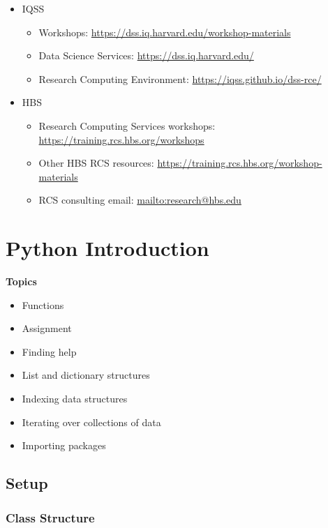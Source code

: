\documentclass[]{book}
\providecommand{\tightlist}{%
  \setlength{\itemsep}{0pt}\setlength{\parskip}{0pt}}
\begin{document}
\begin{itemize}
\tightlist
\item
  IQSS

  \begin{itemize}
  \tightlist
  \item
    Workshops: \url{https://dss.iq.harvard.edu/workshop-materials}
  \item
    Data Science Services: \url{https://dss.iq.harvard.edu/}
  \item
    Research Computing Environment: \url{https://iqss.github.io/dss-rce/}
  \end{itemize}
\item
  HBS

  \begin{itemize}
  \tightlist
  \item
    Research Computing Services workshops: \url{https://training.rcs.hbs.org/workshops}
  \item
    Other HBS RCS resources: \url{https://training.rcs.hbs.org/workshop-materials}
  \item
    RCS consulting email: \url{mailto:research@hbs.edu}
  \end{itemize}
\end{itemize}

\hypertarget{python-introduction}{%
\chapter{Python Introduction}\label{python-introduction}}

\textbf{Topics}

\begin{itemize}
\tightlist
\item
  Functions
\item
  Assignment
\item
  Finding help
\item
  List and dictionary structures
\item
  Indexing data structures
\item
  Iterating over collections of data
\item
  Importing packages
\end{itemize}

\hypertarget{setup-4}{%
\section{Setup}\label{setup-4}}

\hypertarget{class-structure-4}{%
\subsection{Class Structure}\label{class-structure-4}}
\end{document}
